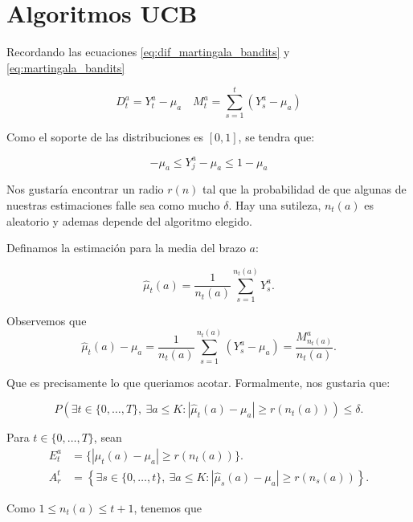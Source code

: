 \section{Algoritmos UCB}

Recordando las ecuaciones \eqref{eq:dif_martingala_bandits} y \eqref{eq:martingala_bandits}

\begin{equation*}
    D^a_t = Y^a_t - \mu_a \quad  M^a_t = \sum^t_{s=1}(Y^a_s-\mu_a)
\end{equation*}

Como el soporte de las distribuciones es \([0,1]\), se tendra que:

\begin{equation}
    -\mu_a \leq Y^a_j - \mu_a \leq 1 - \mu_a
\end{equation}

Nos gustaría encontrar un radio \(r(n)\) tal que la probabilidad de que algunas de nuestras estimaciones falle sea como mucho \(\delta\).
Hay una sutileza, \(n_t(a)\) es aleatorio y ademas depende del algoritmo elegido.

Definamos la estimación para la media del brazo \(a\):

\begin{equation}\label{eq:mu_hat}
    \hat{\mu}_t(a) = \frac{1}{n_t(a)}\sum^{n_t(a)}_{s=1}Y^a_s.
\end{equation}

Observemos que
\begin{equation}
    \hat{\mu}_t(a) - \mu_a = \frac{1}{n_t(a)}\sum^{n_t(a)}_{s=1}(Y^a_s-\mu_a) = \frac{M^a_{n_t(a)}}{n_t(a)}.
\end{equation}

Que es precisamente lo que queriamos acotar. Formalmente, nos gustaria que:

\begin{equation}
P\left(\exists t\in\{0,\ldots,T\},\ \exists a \leq K:\left|\hat{\mu}_t(a) - \mu_a\right| \ge r(n_t(a)) \right) \leq \delta.
\end{equation}

Para \(t\in\{0,\ldots,T\}\), sean
\begin{align*}
    E^a_t &= \{|\hat{\mu}_t(a)-\mu_a| \geq r(n_t(a))\}. \\
    A_r^t &= \left\{\exists s\in\{0,\ldots,t\},\ \exists a \leq K:\left|\hat{\mu}_s(a) - \mu_a\right| \ge r(n_s(a)) \right\}.
\end{align*}

Como \(1\leq n_t(a)\leq t+1\), tenemos que

